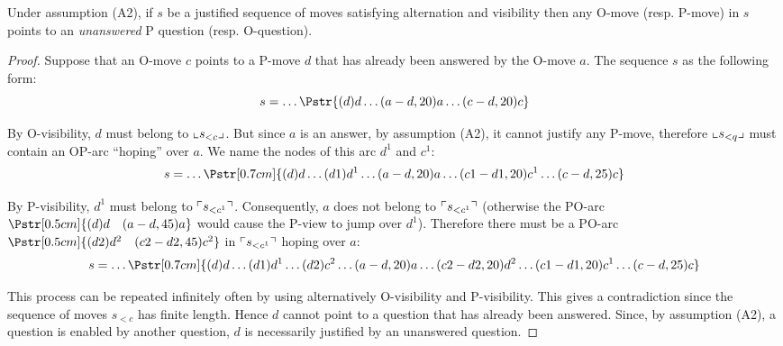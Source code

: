 \begin{lemma}
\label{lem:justfied_by_unanswered}
Under assumption (A2), if $s$ be a justified sequence of moves satisfying alternation and visibility then any O-move (resp. P-move) in $s$ points to an \emph{unanswered} P question (resp. O-question).
\end{lemma}
\begin{proof}
Suppose that an O-move $c$ points to a P-move $d$ that has already been answered by the O-move $a$. The sequence $s$ as the following form:
$$ s= \ldots \Pstr{(d){d}  \ldots  (a-d,20){a}  \ldots  (c-d,20){c}}$$

By O-visibility, $d$ must belong to $\llcorner s_{<c} \lrcorner$. But since $a$ is an answer, by assumption (A2), it cannot justify any P-move, therefore
$\llcorner s_{<q} \lrcorner$ must contain an OP-arc ``hoping'' over $a$. We name the nodes of this arc $d^1$ and $c^1$:
$$ s = \ldots \Pstr[0.7cm]{(d){d}  \ldots  (d1){d^1} \ldots (a-d,20){a} \ldots
 (c1-d1,20){c^1} \ldots (c-d,25){c}}$$

By P-visibility, $d^1$ must belong to $\ulcorner s_{<c^1} \urcorner$. Consequently, $a$ does not belong to $\ulcorner s_{<c^1} \urcorner$ (otherwise the PO-arc $\Pstr[0.5cm]{(d){d} \quad (a-d,45){a}}$ would cause the P-view to jump over $d^1$).
Therefore there must be a PO-arc $\Pstr[0.5cm]{(d2){d^2} \quad (c2-d2,45){c^2}}$ in $\ulcorner s_{<c^1} \urcorner$ hoping over $a$:
$$ s = \ldots \Pstr[0.7cm]{(d){d}  \ldots
(d1){d^1} \ldots (d2){c^2} \ldots
(a-d,20){a} \ldots
 (c2-d2,20){d^2} \ldots (c1-d1,20){c^1} \ldots (c-d,25){c}}$$

This process can be repeated infinitely often by using alternatively O-visibility and P-visibility. This gives a contradiction since the sequence of moves $s_{<c}$ has finite length.
Hence $d$ cannot point to a question that has already been answered. Since, by assumption (A2), a question is enabled by another question, $d$ is necessarily justified by an unanswered question.
\end{proof}


